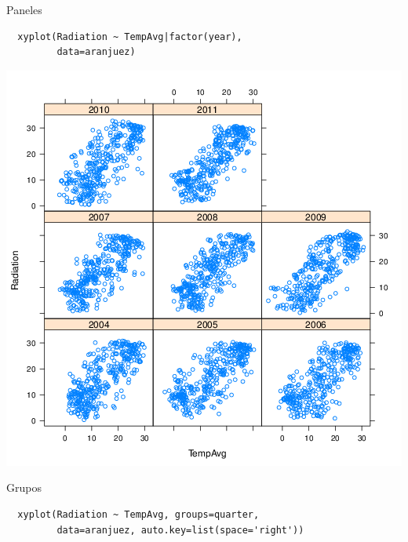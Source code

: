 \documentclass[xcolor={usenames,svgnames,dvipsnames}]{beamer}
\begin{document}
\begin{frame}[fragile,label=sec-3-10]{Paneles}
 \lstset{language=R,label= ,caption= ,numbers=none}
\begin{lstlisting}
  xyplot(Radiation ~ TempAvg|factor(year),
         data=aranjuez)
\end{lstlisting}
\end{frame}

\begin{frame}[label=sec-3-11]{}
\includegraphics[width=.9\linewidth]{figs/xyplotYear.png}
\end{frame}

\begin{frame}[fragile,label=sec-3-12]{Grupos}
 \lstset{language=R,label= ,caption= ,numbers=none}
\begin{lstlisting}
  xyplot(Radiation ~ TempAvg, groups=quarter,
         data=aranjuez, auto.key=list(space='right'))
\end{lstlisting}
\end{frame}
\end{document}

